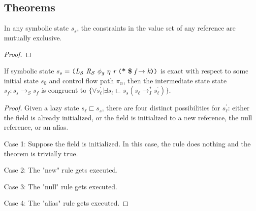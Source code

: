 \subsection{Theorems}

\begin{theorem}
\label{thm:mutex}
In any symbolic state $s_s$, the constraints in the value set of any reference are mutually exclusive.
\end{theorem}
\begin{proof}
\end{proof}

\begin{lemma}
\label{lem:init}
If symbolic state $s_s = \lp \cfgnt{L}_{\mathcal{S}}\ \cfgnt{R}_{\mathcal{S}}\ \phi_g\ \eta\ \cfgnt{r}\ \lp \cfgt{*}\ \cfgt{\$}\ \cfgnt{f} \rightarrow \cfgnt{k}\rp \rp$ is exact with respect to some initial state $s_0$ and control flow path $\pi_n$, then the intermediate state state $s_f : s_s \rightarrow_S s_f$ is congruent to $\{\forall s_\ell^\prime | \exists s_\ell \sqsubset s_s (s_\ell \rightarrow_I^* s_\ell^\prime)  \}$.
\end{lemma}

\begin{proof}%
Given a lazy state $s_\ell \sqsubset s_s$, there are four distinct possibilities for $s_\ell^\prime$: either the field is already initialized, or the field is initialized to a new reference, the null reference, or an alias.

Case 1: Suppose the field is initialized. In this case, the rule does nothing and the theorem is trivially true.


Case 2: The "new" rule gets executed. 

Case 3: The "null" rule gets executed.

Case 4: The "alias" rule gets executed.
\end{proof}

